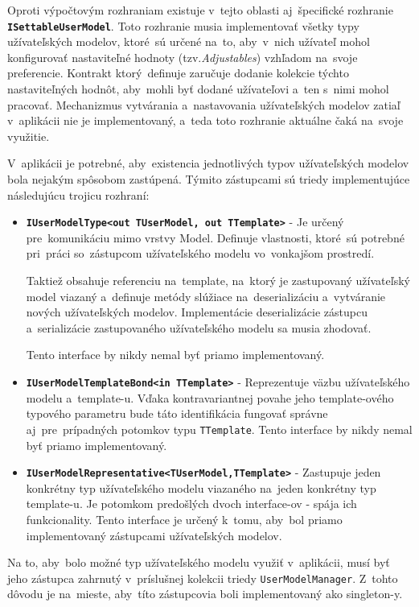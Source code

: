 Oproti výpočtovým rozhraniam existuje v~tejto oblasti aj~špecifické rozhranie \textbf{\texttt{ISettableUserModel}}. Toto rozhranie musia implementovať všetky typy užívateľských modelov, ktoré~sú určené na~to, aby~v~nich užívateľ mohol konfigurovať nastaviteľné hodnoty (tzv.\textit{Adjustables}) vzhľadom na~svoje preferencie. Kontrakt ktorý~definuje zaručuje dodanie kolekcie týchto nastaviteľných hodnôt, aby~mohli byť dodané užívateľovi a~ten s~nimi mohol pracovať. Mechanizmus vytvárania a~nastavovania užívateľských modelov zatiaľ v~aplikácii nie je implementovaný, a~teda toto rozhranie aktuálne čaká na~svoje využitie.  

\bigskip

V~aplikácii je potrebné, aby~existencia jednotlivých typov užívateľských modelov bola nejakým spôsobom zastúpená. Týmito zástupcami sú triedy implementujúce následujúcu trojicu rozhraní:
\begin{itemize}
    \item \textbf{\texttt{IUserModelType<out TUserModel, out TTemplate>}} - Je určený pre~komunikáciu mimo vrstvy Model. Definuje vlastnosti, ktoré~sú potrebné pri~práci so~zástupcom užívateľského modelu vo~vonkajšom prostredí. 
    
    Taktiež obsahuje referenciu na~template, na~ktorý je zastupovaný užívateľský model viazaný a~definuje metódy slúžiace na~deserializáciu a~vytváranie nových užívateľských modelov. Implementácie deserializácie zástupcu a~serializácie zastupovaného užívateľského modelu sa musia zhodovať. 
    
    Tento interface by nikdy nemal byť priamo implementovaný.
    \item \textbf{\texttt{IUserModelTemplateBond<in TTemplate>}} - Reprezentuje väzbu užívateľského modelu a~template-u.  Vďaka kontravariantnej povahe jeho template-ového typového parametru bude táto identifikácia fungovať správne aj~pre~prípadných potomkov typu \texttt{TTemplate}. Tento interface by nikdy nemal byť priamo implementovaný.
    \item \textbf{\texttt{IUserModelRepresentative<TUserModel,TTemplate>}} - Zastupuje jeden konkrétny typ užívateľského modelu viazaného na~jeden konkrétny typ template-u. Je potomkom predošlých dvoch interface-ov - spája ich funkcionality. Tento interface je určený k~tomu, aby~bol priamo implementovaný zástupcami užívateľských modelov.   
\end{itemize}

Na to, aby~bolo možné typ užívateľského modelu využiť v~aplikácii, musí byť jeho zástupca zahrnutý v~príslušnej kolekcii triedy \texttt{UserModelManager}. Z~tohto dôvodu je na~mieste, aby~títo zástupcovia boli implementovaný ako singleton-y.

